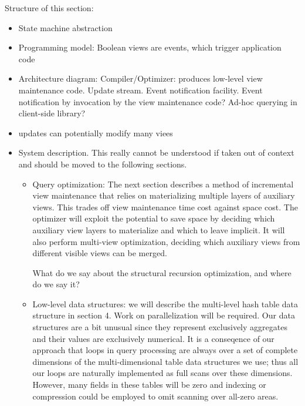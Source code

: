 Structure of this section:
\begin{itemize}
\item
State machine abstraction

\item
Programming model: Boolean views are events, which trigger application code

\item
Architecture diagram:
Compiler/Optimizer: produces low-level view maintenance code.
Update stream.
Event notification facility.
Event notification by invocation by the view maintenance code?
Ad-hoc querying in client-side library?

\item updates can potentially modify many viees

\item
System description.
This really cannot be understood if taken out of context and should be moved to the following sections.
\begin{itemize}
\item
Query optimization: The next section describes a method of incremental view maintenance that relies on materializing multiple layers of auxiliary views. This trades off view maintenance time cost against space cost. The optimizer will exploit the potential to save space by  deciding which auxiliary view layers to materialize and which to leave implicit. It will also perform
multi-view optimization, deciding which auxiliary views from different visible views can be merged.

What do we say about the structural recursion optimization, and where do we say it?

\item
Low-level data structures: we will describe the multi-level hash table data structure in section 4. Work on parallelization will be required. Our data structures are a bit unusual since they represent exclusively aggregates and their values are exclusively numerical. It is a conseqence of our approach that loops in query processing are always over a set of complete dimensions of the multi-dimensional table data structures we use; thus all our loops are naturally implemented as full scans over these dimensions. However, many fields in these tables will be zero and indexing or compression could be employed to omit scanning over all-zero areas.
\end{itemize}
\end{itemize}


